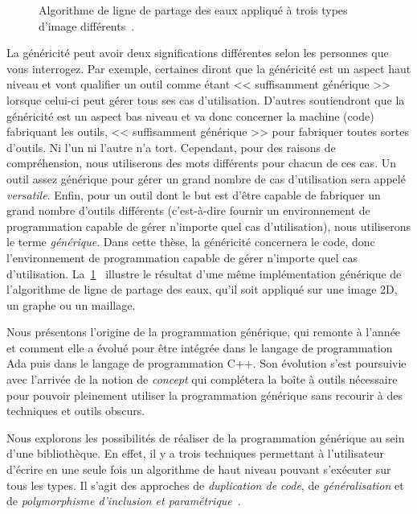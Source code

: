 \begin{figure}[htbp]

  \caption[]{Algorithme de ligne de partage des eaux appliqué à trois types d'image différents~\parencite{levillain.2014.ciarp}.}
  \label{resume:fig:type.vs.algo}
\end{figure}

La généricité peut avoir deux significations différentes selon les personnes que vous interrogez. Par exemple, certaines
diront que la généricité est un aspect haut niveau et vont qualifier un outil comme étant << suffisamment générique >>
lorsque celui-ci peut gérer tous ses cas d'utilisation. D'autres soutiendront que la généricité est un aspect bas niveau
et va donc concerner la machine (code) fabriquant les outils, << suffisamment générique >> pour fabriquer toutes sortes
d'outils. Ni l'un ni l'autre n'a tort. Cependant, pour des raisons de compréhension, nous utiliserons des mots
différents pour chacun de ces cas. Un outil assez générique pour gérer un grand nombre de cas d'utilisation sera appelé
\emph{versatile}. Enfin, pour un outil dont le but est d'être capable de fabriquer un grand nombre d'outils différents
(c'est-à-dire fournir un environnement de programmation capable de gérer n'importe quel cas d'utilisation), nous
utiliserons le terme \emph{générique}. Dans cette thèse, la généricité concernera le code, donc l'environnement de
programmation capable de gérer n'importe quel cas d'utilisation.
La~\cref{resume:fig:type.vs.algo}~\parencite{levillain.2011.phd} illustre le résultat d'une même implémentation
générique de l'algorithme de ligne de partage des eaux, qu'il soit appliqué sur une image 2D, un graphe ou un maillage.

Nous présentons l'origine de la programmation générique, qui remonte à l'année~ et
comment elle a évolué pour être intégrée dans le langage de programmation Ada puis dans le langage de programmation C++.
Son évolution s'est poursuivie avec l'arrivée de la notion de \emph{concept} qui complétera la boîte à outils nécessaire
pour pouvoir pleinement utiliser la programmation générique sans recourir à des techniques et outils obscurs.

Nous explorons les possibilités de réaliser de la programmation générique au sein d'une bibliothèque. En effet, il y a
trois techniques permettant à l'utilisateur d'écrire en une seule fois un algorithme de haut niveau pouvant s'exécuter
sur tous les types. Il s'agit des approches de \emph{duplication de code}, de \emph{généralisation} et de
\emph{polymorphisme d'inclusion et paramétrique}~\parencite{gibbons.2007.datatype}.

